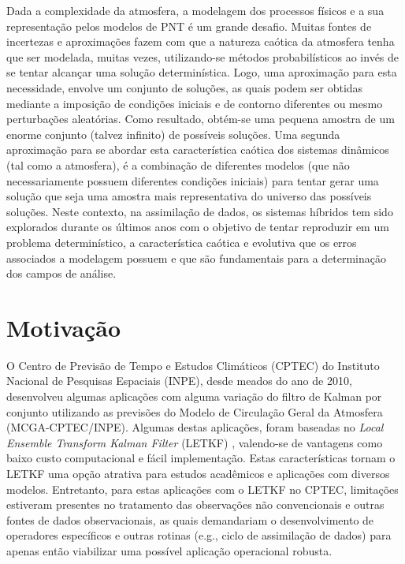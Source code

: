 Dada a complexidade da atmosfera, a modelagem dos processos físicos e a sua representação pelos modelos de PNT é um grande desafio. Muitas fontes de incertezas e aproximações fazem com que a natureza caótica da atmosfera tenha que ser modelada, muitas vezes, utilizando-se métodos probabilísticos ao invés de se tentar alcançar uma solução determinística. Logo, uma aproximação para esta necessidade, envolve um conjunto de soluções, as quais podem ser obtidas mediante a imposição de condições iniciais e de contorno diferentes ou mesmo perturbações aleatórias. Como resultado, obtém-se uma pequena amostra de um enorme conjunto (talvez infinito) de possíveis soluções. Uma segunda aproximação para se abordar esta característica caótica dos sistemas dinâmicos (tal como a atmosfera), é a combinação de diferentes modelos (que não necessariamente possuem diferentes condições iniciais) para tentar gerar uma solução que seja uma amostra mais representativa do universo das possíveis soluções. Neste contexto, na assimilação de dados, os sistemas híbridos tem sido explorados durante os últimos anos com o objetivo de tentar reproduzir em um problema determinístico, a característica caótica e evolutiva que os erros associados a modelagem possuem e que são fundamentais para a determinação dos campos de análise. 

\section{Motivação}
\label{motivacao}

O Centro de Previsão de Tempo e Estudos Climáticos (CPTEC) do Instituto Nacional de Pesquisas Espaciais (INPE), desde meados do ano de 2010, desenvolveu algumas aplicações com alguma variação do filtro de Kalman por conjunto utilizando as previsões do Modelo de Circulação Geral da Atmosfera (MCGA-CPTEC/INPE). Algumas destas aplicações, foram baseadas no \textit{Local Ensemble Transform Kalman Filter} (LETKF) \cite{huntetal/2007}, valendo-se de vantagens como baixo custo computacional e fácil implementação. Estas características tornam o LETKF uma opção atrativa para estudos acadêmicos e aplicações com diversos modelos. Entretanto, para estas aplicações com o LETKF no CPTEC, limitações estiveram presentes no tratamento das observações não convencionais e outras fontes de dados observacionais, as quais demandariam o desenvolvimento de operadores específicos e outras rotinas (e.g., ciclo de assimilação de dados) para apenas então viabilizar uma possível aplicação operacional robusta. 

